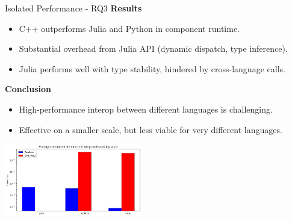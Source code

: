 \begin{frame}{Isolated Performance - RQ3}
        \textbf{Results}
        \begin{itemize}
            \item C++ outperforms Julia and Python in component runtime.
            \item Substantial overhead from Julia API (dynamic dispatch, type inference).
            \item Julia performs well with type stability, hindered by cross-language calls.
        \end{itemize}
        \pause
        \textbf{Conclusion}
        \begin{itemize}
            \item High-performance interop between different languages is challenging.
            \item Effective on a smaller scale, but less viable for very different languages.
        \end{itemize}
    \begin{center}
        \includegraphics[width=0.45\textwidth]{assets/time-and-overhead-log.png} %
    \end{center}
\end{frame}